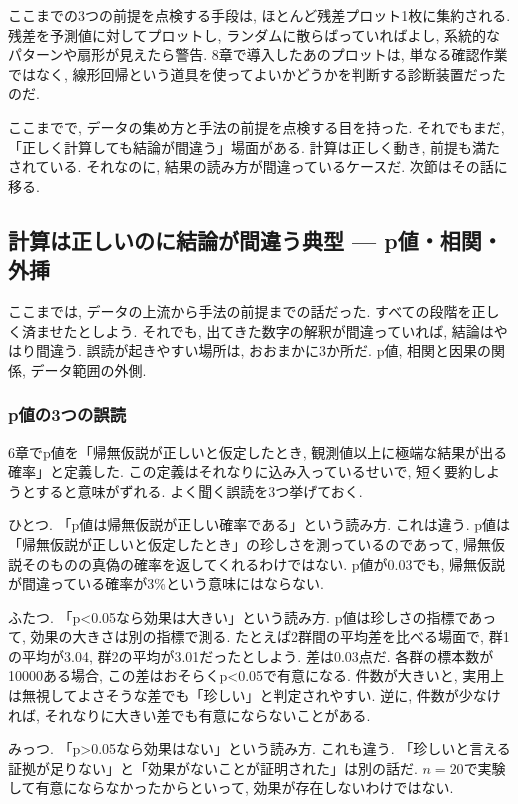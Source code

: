 ここまでの3つの前提を点検する手段は, ほとんど残差プロット1枚に集約される.
残差を予測値に対してプロットし, ランダムに散らばっていればよし, 系統的なパターンや扇形が見えたら警告.
8章で導入したあのプロットは, 単なる確認作業ではなく, 線形回帰という道具を使ってよいかどうかを判断する診断装置だったのだ.

ここまでで, データの集め方と手法の前提を点検する目を持った.
それでもまだ, 「正しく計算しても結論が間違う」場面がある.
計算は正しく動き, 前提も満たされている. それなのに, 結果の読み方が間違っているケースだ.
次節はその話に移る.


\subsection{計算は正しいのに結論が間違う典型 — p値・相関・外挿}

ここまでは, データの上流から手法の前提までの話だった.
すべての段階を正しく済ませたとしよう.
それでも, 出てきた数字の解釈が間違っていれば, 結論はやはり間違う.
誤読が起きやすい場所は, おおまかに3か所だ. p値, 相関と因果の関係, データ範囲の外側.

\subsubsection*{p値の3つの誤読}

6章でp値を「帰無仮説が正しいと仮定したとき, 観測値以上に極端な結果が出る確率」と定義した.
この定義はそれなりに込み入っているせいで, 短く要約しようとすると意味がずれる.
よく聞く誤読を3つ挙げておく.

ひとつ. 「p値は帰無仮説が正しい確率である」という読み方.
これは違う. p値は「帰無仮説が正しいと仮定したとき」の珍しさを測っているのであって, 帰無仮説そのものの真偽の確率を返してくれるわけではない.
p値が0.03でも, 帰無仮説が間違っている確率が3\%という意味にはならない.

ふたつ. 「p<0.05なら効果は大きい」という読み方.
p値は珍しさの指標であって, 効果の大きさは別の指標で測る.
たとえば2群間の平均差を比べる場面で, 群1の平均が3.04, 群2の平均が3.01だったとしよう.
差は0.03点だ. 各群の標本数が10000ある場合, この差はおそらくp<0.05で有意になる.
件数が大きいと, 実用上は無視してよさそうな差でも「珍しい」と判定されやすい.
逆に, 件数が少なければ, それなりに大きい差でも有意にならないことがある.

みっつ. 「p>0.05なら効果はない」という読み方.
これも違う. 「珍しいと言える証拠が足りない」と「効果がないことが証明された」は別の話だ.
$n=20$で実験して有意にならなかったからといって, 効果が存在しないわけではない.

